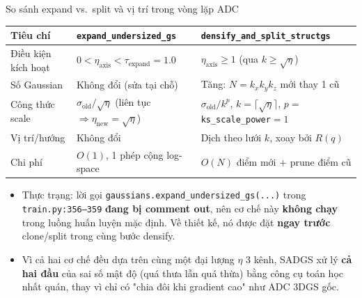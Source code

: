 \begin{frame}{So sánh expand vs.\ split và vị trí trong vòng lặp ADC}
\footnotesize
\begin{tabular}{lll}
\toprule
\textbf{Tiêu chí} & \texttt{expand\_undersized\_gs} & \texttt{densify\_and\_split\_structgs} \\
\midrule
Điều kiện kích hoạt & $0<\eta_{\text{axis}}<\tau_{\text{expand}}{=}1.0$ & $\eta_{\text{axis}}\ge 1$ (qua $k\ge\sqrt{\eta}$) \\
Số Gaussian & Không đổi (sửa tại chỗ) & Tăng: $N{=}k_x k_y k_z$ mới thay 1 cũ \\
Công thức scale & $\sigma_{\text{old}}/\sqrt{\eta}$ (liên tục $\Rightarrow \eta_{\text{new}}{=}\sqrt{\eta}$) & $\sigma_{\text{old}}/k^{p}$, $k{=}\lceil\sqrt{\eta}\rceil$, $p{=}$\texttt{ks\_scale\_power}${=}1$ \\
Vị trí/hướng & Không đổi & Dịch theo lưới $k$, xoay bởi $R(q)$ \\
Chi phí & $O(1)$, 1 phép cộng log-space & $O(N)$ điểm mới + prune điểm cũ \\
\bottomrule
\end{tabular}
\vspace{0.3cm}
\begin{itemize}
    \item \alert{Thực trạng:} lời gọi \texttt{gaussians.expand\_undersized\_gs(...)} trong \texttt{train.py:356--359} \textbf{đang bị comment out}, nên cơ chế này \textbf{không chạy} trong luồng huấn luyện mặc định. Về thiết kế, nó được đặt \textbf{ngay trước} clone/split trong cùng bước densify.
    \item Vì cả hai cơ chế đều dựa trên cùng một đại lượng $\eta$ 3 kênh, SADGS xử lý \textbf{cả hai đầu} của sai số mật độ (quá thưa lẫn quá thừa) bằng công cụ toán học nhất quán, thay vì chỉ có "chia đôi khi gradient cao" như ADC 3DGS gốc.
\end{itemize}
\end{frame}
